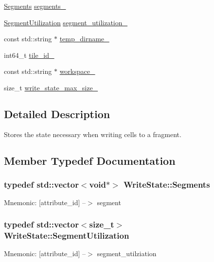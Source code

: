 \begin{DoxyCompactItemize}
\item 
\hyperlink{classWriteState_aad30b2ca76d7c514032911e74076cfc5}{Segments} \hyperlink{classWriteState_a4261c22f11c9f6bd4e5ef0ad91e13c90}{segments\+\_\+}
\item 
\hyperlink{classWriteState_ae2a9d7195188e68b68d0c33725cbf460}{Segment\+Utilization} \hyperlink{classWriteState_a45a9a04b9520ed82c87322acfa94a72c}{segment\+\_\+utilization\+\_\+}
\item 
const std\+::string $\ast$ \hyperlink{classWriteState_ac3c5f8a8d2b226f3cac8770fc665b63a}{temp\+\_\+dirname\+\_\+}
\item 
int64\+\_\+t \hyperlink{classWriteState_a6f1997f7702ccd133959484348faf49d}{tile\+\_\+id\+\_\+}
\item 
const std\+::string $\ast$ \hyperlink{classWriteState_ac794be3613148e959cc2dd138a06553d}{workspace\+\_\+}
\item 
size\+\_\+t \hyperlink{classWriteState_ae709f5fb288797a81ef52b29c954732e}{write\+\_\+state\+\_\+max\+\_\+size\+\_\+}
\end{DoxyCompactItemize}


\subsection{Detailed Description}
Stores the state necessary when writing cells to a fragment. 

\subsection{Member Typedef Documentation}
\hypertarget{classWriteState_aad30b2ca76d7c514032911e74076cfc5}{}
\subsubsection[{Segments}]{\setlength{\rightskip}{0pt plus 5cm}typedef std\+::vector$<$void$\ast$$>$ {\bf Write\+State\+::\+Segments}}\label{classWriteState_aad30b2ca76d7c514032911e74076cfc5}
Mnemonic\+: \mbox{[}attribute\+\_\+id\mbox{]} --$>$ segment \hypertarget{classWriteState_ae2a9d7195188e68b68d0c33725cbf460}{}
\subsubsection[{Segment\+Utilization}]{\setlength{\rightskip}{0pt plus 5cm}typedef std\+::vector$<$size\+\_\+t$>$ {\bf Write\+State\+::\+Segment\+Utilization}}\label{classWriteState_ae2a9d7195188e68b68d0c33725cbf460}
Mnemonic\+: \mbox{[}attribute\+\_\+id\mbox{]} --$>$ segment\+\_\+utilziation 

